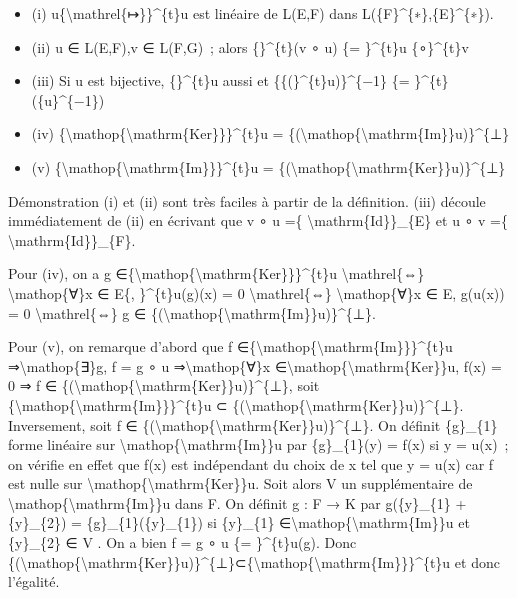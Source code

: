 \documentclass[]{article}
\begin{document}
\begin{itemize}
\itemsep1pt\parskip0pt
\item
  (i) u\{\textbackslash{}mathrel\{↦\}\}\^{}\{t\}u est linéaire de L(E,F)
  dans L(\{F\}\^{}\{∗\},\{E\}\^{}\{∗\}).
\item
  (ii) u ∈ L(E,F),v ∈ L(F,G)~; alors \{\}\^{}\{t\}(v ∘ u) \{=
  \}\^{}\{t\}u \{∘\}\^{}\{t\}v
\item
  (iii) Si u est bijective, \{\}\^{}\{t\}u aussi et
  \{\{(\}\^{}\{t\}u)\}\^{}\{−1\} \{= \}\^{}\{t\}(\{u\}\^{}\{−1\})
\item
  (iv)
  \{\textbackslash{}mathop\{\textbackslash{}mathrm\{Ker\}\}\}\^{}\{t\}u
  =
  \{(\textbackslash{}mathop\{\textbackslash{}mathrm\{Im\}\}u)\}\^{}\{⊥\}
\item
  (v)
  \{\textbackslash{}mathop\{\textbackslash{}mathrm\{Im\}\}\}\^{}\{t\}u =
  \{(\textbackslash{}mathop\{\textbackslash{}mathrm\{Ker\}\}u)\}\^{}\{⊥\}
\end{itemize}

Démonstration (i) et (ii) sont très faciles à partir de la définition.
(iii) découle immédiatement de (ii) en écrivant que v ∘ u =\{
\textbackslash{}mathrm\{Id\}\}\_\{E\} et u ∘ v =\{
\textbackslash{}mathrm\{Id\}\}\_\{F\}.

Pour (iv), on a g
∈\{\textbackslash{}mathop\{\textbackslash{}mathrm\{Ker\}\}\}\^{}\{t\}u
\textbackslash{}mathrel\{⇔\} \textbackslash{}mathop\{∀\}x ∈ E\{,
\}\^{}\{t\}u(g)(x) = 0 \textbackslash{}mathrel\{⇔\}
\textbackslash{}mathop\{∀\}x ∈ E, g(u(x)) = 0
\textbackslash{}mathrel\{⇔\} g ∈
\{(\textbackslash{}mathop\{\textbackslash{}mathrm\{Im\}\}u)\}\^{}\{⊥\}.

Pour (v), on remarque d'abord que f
∈\{\textbackslash{}mathop\{\textbackslash{}mathrm\{Im\}\}\}\^{}\{t\}u
⇒\textbackslash{}mathop\{∃\}g, f = g ∘ u ⇒\textbackslash{}mathop\{∀\}x
∈\textbackslash{}mathop\{\textbackslash{}mathrm\{Ker\}\}u, f(x) = 0 ⇒ f
∈
\{(\textbackslash{}mathop\{\textbackslash{}mathrm\{Ker\}\}u)\}\^{}\{⊥\},
soit
\{\textbackslash{}mathop\{\textbackslash{}mathrm\{Im\}\}\}\^{}\{t\}u ⊂
\{(\textbackslash{}mathop\{\textbackslash{}mathrm\{Ker\}\}u)\}\^{}\{⊥\}.
Inversement, soit f ∈
\{(\textbackslash{}mathop\{\textbackslash{}mathrm\{Ker\}\}u)\}\^{}\{⊥\}.
On définit \{g\}\_\{1\} forme linéaire sur
\textbackslash{}mathop\{\textbackslash{}mathrm\{Im\}\}u par
\{g\}\_\{1\}(y) = f(x) si y = u(x)~; on vérifie en effet que f(x) est
indépendant du choix de x tel que y = u(x) car f est nulle sur
\textbackslash{}mathop\{\textbackslash{}mathrm\{Ker\}\}u. Soit alors V
un supplémentaire de
\textbackslash{}mathop\{\textbackslash{}mathrm\{Im\}\}u dans F. On
définit g : F → K par g(\{y\}\_\{1\} + \{y\}\_\{2\}) =
\{g\}\_\{1\}(\{y\}\_\{1\}) si \{y\}\_\{1\}
∈\textbackslash{}mathop\{\textbackslash{}mathrm\{Im\}\}u et \{y\}\_\{2\}
∈ V . On a bien f = g ∘ u \{= \}\^{}\{t\}u(g). Donc
\{(\textbackslash{}mathop\{\textbackslash{}mathrm\{Ker\}\}u)\}\^{}\{⊥\}⊂\{\textbackslash{}mathop\{\textbackslash{}mathrm\{Im\}\}\}\^{}\{t\}u
et donc l'égalité.
\end{document}
